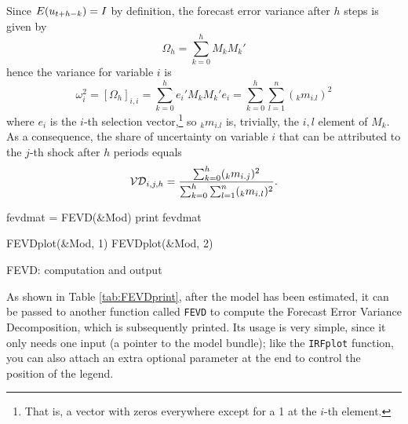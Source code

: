 \documentclass[a4paper,10pt]{article}
\newcommand{\cmd}[1]{\texttt{#1}}
\newcommand{\StS}[1]{\ensuremath u_{#1}}
\newcommand{\FEVD}[1]{\ensuremath \mathcal{VD}_{#1}}
\begin{document}
Since $E(\StS{t+h-k}) = I$ by definition, the forecast error variance
after $h$ steps is given by
\[
  \Omega_h = \sum_{k=0}^h M_k M_k'
\]
hence the variance for variable $i$ is
\[
  \omega^2_i = \left[ \Omega_h \right]_{i,i} = \sum_{k=0}^h e_i' M_k M_k' e_i =
  \sum_{k=0}^h \sum_{l=1}^n ({}_km_{i.l})^2 
\]
where $e_i$ is the $i$-th selection vector,\footnote{That is, a vector
  with zeros everywhere except for a 1 at the $i$-th element.} so
${}_km_{i.l}$ is, trivially, the $i,l$ element of $M_k$. As a
consequence, the share of uncertainty on variable $i$ that can be
attributed to the $j$-th shock after $h$ periods equals
\[
  \FEVD{i,j,h} =
  \frac{\sum_{k=0}^h ({}_km_{i.j})^2 }{\sum_{k=0}^h \sum_{l=1}^n
    ({}_km_{i.l})^2 } .
\]

\begin{table}[htbp]
\begin{scode}
  fevdmat = FEVD(&Mod)
  print fevdmat

  FEVDplot(&Mod, 1)
  FEVDplot(&Mod, 2)
  \end{scode}
  \caption{FEVD: computation and output}
  \label{tab:FEVDprint}
\end{table}

As shown in Table \ref{tab:FEVDprint}, after the model has been
estimated, it can be passed to another function called \texttt{FEVD}
to compute the Forecast Error Variance Decomposition, which is
subsequently printed. Its usage is very simple, since it only needs
one input (a pointer to the model bundle); like the \cmd{IRFplot}
function, you can also attach an extra optional parameter at the end
to control the position of the legend.
\end{document}
